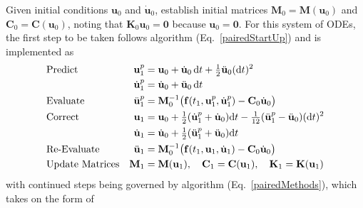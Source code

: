 Given initial conditions $\mathbf{u}_0$ and $\dot{\mathbf{u}}_0$, establish initial matrices $\mathbf{M}_0 = \mathbf{M} ( \mathbf{u}_0 )$ and $\mathbf{C}_0 = \mathbf{C} ( \mathbf{u}_0 )$, noting that $\mathbf{K}_0 \mathbf{u}_0 = \mathbf{0}$ because $\mathbf{u}_0 = \mathbf{0}$.  For this system of ODEs, the first step to be taken follows algorithm (Eq.~\ref{pairedStartUp}) and is implemented as
\begin{subequations}
    \notag
    \begin{align}
    \mbox{} & \text{Predict} & 
    \mathbf{u}_1^p & = \mathbf{u}_0 + \dot{\mathbf{u}}_0 \, \mathrm{d}t +
    \tfrac{1}{2} \ddot{\mathbf{u}}_0 ( \mathrm{d}t )^2 \\
    \mbox{} & &
    \dot{\mathbf{u}}^p_1 & = \dot{\mathbf{u}}_0 + \ddot{\mathbf{u}}_0 \, \mathrm{d}t \\
    \mbox{} & \text{Evaluate} &
    \ddot{\mathbf{u}}^p_1 & = \mathbf{M}^{-1}_0 \bigl( 
    \mathbf{f}(t_{1} , \mathbf{u}_1^p , \dot{\mathbf{u}}_1^p ) - 
    \mathbf{C}_0 \dot{\mathbf{u}}_0 \bigr) \\
    \mbox{} & \text{Correct} &
    \mathbf{u}_1 & = \mathbf{u}_0 + \tfrac{1}{2} 
    ( \dot{\mathbf{u}}^p_1 + \dot{\mathbf{u}}_0 ) \mathrm{d}t -
    \tfrac{1}{12} ( \ddot{\mathbf{u}}^p_1 - \ddot{\mathbf{u}}_0 ) 
    ( \mathrm{d}t )^2 \\
    \mbox{} & &
    \dot{\mathbf{u}}_1 & = \dot{\mathbf{u}}_0 + \tfrac{1}{2}  
    ( \ddot{\mathbf{u}}_1^p + \ddot{\mathbf{u}}_0 ) \mathrm{d}t \\
    \mbox{} & \text{Re-Evaluate} &
    \ddot{\mathbf{u}}_1 & = \mathbf{M}^{-1}_0 \bigl( 
    \mathbf{f}( t_1 , \mathbf{u}_1 , \dot{\mathbf{u}}_1 ) - 
    \mathbf{C}_0 \dot{\mathbf{u}}_0 \bigr) \\
    \mbox{} & \text{Update Matrices} & 
    \mathbf{M}_1 & = \mathbf{M} ( \mathbf{u}_1 ) , \quad
    \mathbf{C}_1 = \mathbf{C} ( \mathbf{u}_1 ) , \quad
    \mathbf{K}_1 = \mathbf{K} ( \mathbf{u}_1 )
    \end{align}
\end{subequations}
with continued steps being governed by algorithm (Eq.~\ref{pairedMethods}), which takes on the form of
